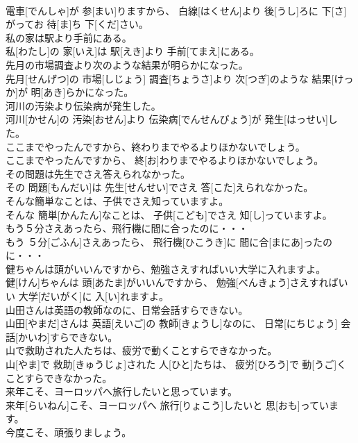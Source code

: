 \documentclass[8pt]{extreport}
\begin{document}
\begin{CJK}{UTF8}{min}
\\	電車[でんしゃ]が 参[まい]りますから、 白線[はくせん]より 後[うし]ろに 下[さ]がってお 待[ま]ち 下[くだ]さい。	
\\	私の家は駅より手前にある。	
\\	私[わたし]の 家[いえ]は 駅[えき]より 手前[てまえ]にある。	
\\	先月の市場調査より次のような結果が明らかになった。	
\\	先月[せんげつ]の 市場[しじょう] 調査[ちょうさ]より 次[つぎ]のような 結果[けっか]が 明[あき]らかになった。	
\\	河川の汚染より伝染病が発生した。	
\\	河川[かせん]の 汚染[おせん]より 伝染病[でんせんびょう]が 発生[はっせい]した。	
\\	ここまでやったんですから、終わりまでやるよりほかないでしょう。	
\\	ここまでやったんですから、 終[お]わりまでやるよりほかないでしょう。	
\\	その問題は先生でさえ答えられなかった。	
\\	その 問題[もんだい]は 先生[せんせい]でさえ 答[こた]えられなかった。	
\\	そんな簡単なことは、子供でさえ知っていますよ。	
\\	そんな 簡単[かんたん]なことは、 子供[こども]でさえ 知[し]っていますよ。	
\\	もう５分さえあったら、飛行機に間に合ったのに・・・	
\\	もう ５分[ごふん]さえあったら、 飛行機[ひこうき]に 間に合[まにあ]ったのに・・・	
\\	健ちゃんは頭がいいんですから、勉強さえすればいい大学に入れますよ。	
\\	健[けん]ちゃんは 頭[あたま]がいいんですから、 勉強[べんきょう]さえすればいい 大学[だいがく]に 入[い]れますよ。	
\\	山田さんは英語の教師なのに、日常会話すらできない。	
\\	山田[やまだ]さんは 英語[えいご]の 教師[きょうし]なのに、 日常[にちじょう] 会話[かいわ]すらできない。	
\\	山で救助された人たちは、疲労で動くことすらできなかった。	
\\	山[やま]で 救助[きゅうじょ]された 人[ひと]たちは、 疲労[ひろう]で 動[うご]くことすらできなかった。	
\\	来年こそ、ヨーロッパへ旅行したいと思っています。	
\\	来年[らいねん]こそ、ヨーロッパへ 旅行[りょこう]したいと 思[おも]っています。	
\\	今度こそ、頑張りましょう。	

\end{CJK}
\end{document}
